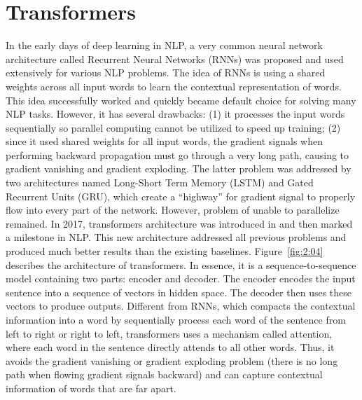 \documentclass[12pt, sort&compress]{report}
\begin{document}
\section{Transformers}
In the early days of deep learning in NLP, a very common neural network architecture called Recurrent Neural Networks (RNNs) was proposed and used extensively for various NLP problems. The idea of RNNs is using a shared weights across all input words to learn the contextual representation of words. This idea successfully worked and quickly became default choice for solving many NLP tasks. However, it has several drawbacks: (1) it processes the input words sequentially so parallel computing cannot be utilized to speed up training; (2) since it used shared weights for all input words, the gradient signals when performing backward propagation must go through a very long path, causing to gradient vanishing and gradient exploding. The latter problem was addressed by two architectures named Long-Short Term Memory (LSTM) and Gated Recurrent Units (GRU), which create a “highway” for gradient signal to properly flow into every part of the network. However, problem of unable to parallelize remained. In 2017, transformers architecture was introduced in \cite{vaswani2017attention} and then marked a milestone in NLP. This new architecture addressed all previous problems and produced much better results than the existing baselines. Figure~\ref{fig:2:04} describes the architecture of transformers. In essence, it is a sequence-to-sequence model containing two parts: encoder and decoder. The encoder encodes the input sentence into a sequence of vectors in hidden space. The decoder then uses these vectors to produce outputs. Different from RNNs, which compacts the contextual information into a word by sequentially process each word of the sentence from left to right or right to left, transformers uses a mechanism called attention, where each word in the sentence directly attends to all other words. Thus, it avoids the gradient vanishing or gradient exploding problem (there is no long path when flowing gradient signals backward) and can capture contextual information of words that are far apart.
\end{document}
